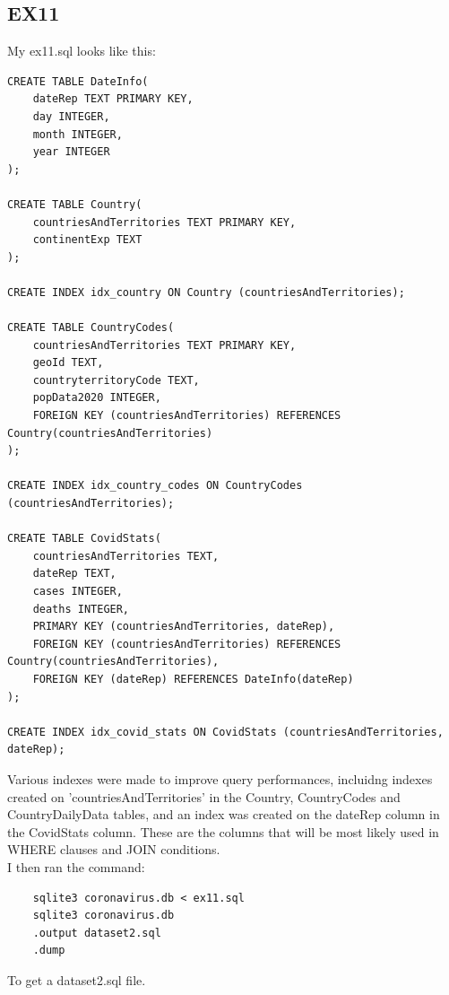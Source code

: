 \documentclass[]{article}
\begin{document}
\subsection{EX11}
My ex11.sql looks like this:
\begin{verbatim}
CREATE TABLE DateInfo(
    dateRep TEXT PRIMARY KEY,
    day INTEGER,
    month INTEGER,
    year INTEGER
);

CREATE TABLE Country(
    countriesAndTerritories TEXT PRIMARY KEY,
    continentExp TEXT
);

CREATE INDEX idx_country ON Country (countriesAndTerritories);

CREATE TABLE CountryCodes(
    countriesAndTerritories TEXT PRIMARY KEY,
    geoId TEXT,
    countryterritoryCode TEXT,
    popData2020 INTEGER,
    FOREIGN KEY (countriesAndTerritories) REFERENCES Country(countriesAndTerritories)
);

CREATE INDEX idx_country_codes ON CountryCodes (countriesAndTerritories);

CREATE TABLE CovidStats(
    countriesAndTerritories TEXT,
    dateRep TEXT,
    cases INTEGER,
    deaths INTEGER,
    PRIMARY KEY (countriesAndTerritories, dateRep),
    FOREIGN KEY (countriesAndTerritories) REFERENCES Country(countriesAndTerritories),
    FOREIGN KEY (dateRep) REFERENCES DateInfo(dateRep)
);

CREATE INDEX idx_covid_stats ON CovidStats (countriesAndTerritories, dateRep);

\end{verbatim}
Various indexes were made to improve query performances, incluidng indexes created on 'countriesAndTerritories' in the Country, CountryCodes and CountryDailyData tables, and an index was created on the dateRep column in the CovidStats column. These are the columns that will be most likely used in WHERE clauses and JOIN conditions.\\
I then ran the command:
\begin{verbatim}
    sqlite3 coronavirus.db < ex11.sql
    sqlite3 coronavirus.db
    .output dataset2.sql
    .dump
\end{verbatim}
To get a dataset2.sql file.
\end{document}
